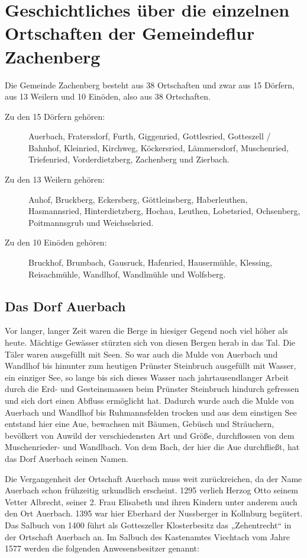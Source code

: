 \documentclass[12pt,a4pager]{book}
\begin{document}
\chapter[Die einzelnen Ortschaften]{Geschichtliches über die einzelnen
Ortschaften der Gemeindeflur Zachenberg}

Die Gemeinde Zachenberg besteht aus 38 Ortschaften und zwar aus 15 Dörfern, aus
13 Weilern und 10 Einöden, also aus 38 Ortschaften.

\begin{description}
\item[Zu den 15 Dörfern gehören:] Auerbach, Fratersdorf, Furth, Giggenried,
Gottlesried, Gotteszell / Bahnhof, Kleinried, Kirchweg, Köckersried,
Lämmersdorf, Muschenried, Triefenried, Vorderdietzberg, Zachenberg und Zierbach.

\item[Zu den 13 Weilern gehören:] Auhof, Bruckberg, Eckersberg, Göttleinsberg,
Haberleuthen, Hasmannsried, Hinterdietzberg, Hochau, Leuthen, Lobetsried,
Ochsenberg, Poitmannsgrub und Weichselsried.

\item[Zu den 10 Einöden gehören:] Bruckhof, Brumbach, Gausruck, Hafenried,
Hausermühle, Klessing, Reisachmühle, Wandlhof, Wandlmühle und Wolfsberg.
\end{description}

\section{Das Dorf Auerbach}

Vor langer, langer Zeit waren die Berge in hiesiger Gegend noch viel höher als
heute. Mächtige Gewässer stürzten sich von diesen Bergen herab in das Tal. Die
Täler waren ausgefüllt mit Seen. So war auch die Mulde von Auerbach und Wandlhof
bis hinunter zum heutigen Prünster Steinbruch ausgefüllt mit Wasser, ein
einziger See, so lange bis sich dieses Wasser nach jahrtausendlanger Arbeit
durch die Erd- und Gesteinsmassen beim Prünster Steinbruch hindurch gefressen
und sich dort einen Abfluss ermöglicht hat. Dadurch wurde auch die Mulde von
Auerbach und Wandlhof bis Ruhmannsfelden trocken und aus dem einstigen See
entstand hier eine Aue, bewachsen mit Bäumen, Gebüsch und Sträuchern, bevölkert
von Auwild der verschiedensten Art und Größe, durchflossen von dem
Muschenrieder- und Wandlbach. Von dem Bach, der hier die Aue durchfließt, hat
das Dorf Auerbach seinen Namen.

Die Vergangenheit der Ortschaft Auerbach muss weit zurückreichen, da der Name
Auerbach schon frühzeitig urkundlich erscheint. 1295 verlieh Herzog Otto seinem
Vetter Albrecht, seiner 2. Frau Elisabeth und ihren Kindern unter anderem auch
den Ort Auerbach. 1395 war hier Eberhard der Nussberger in Kollnburg begütert.
Das Salbuch von 1400 führt als Gotteszeller Klosterbesitz das „Zehentrecht“ in
der Ortschaft Auerbach an. Im Salbuch des Kastenamtes Viechtach vom Jahre 1577
werden die folgenden Anwesensbesitzer genannt:
\end{document}
